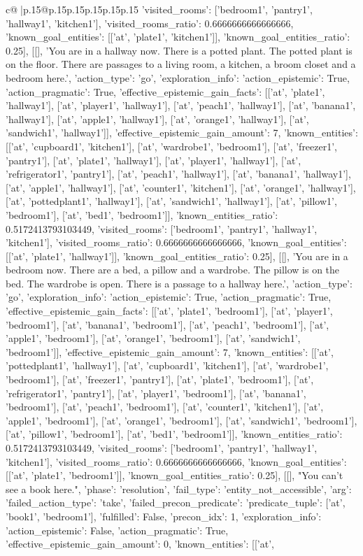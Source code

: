 \documentclass{article}
\begin{document}
{\begin{supertabular}{c@{$\;$}|p{.15\linewidth}@{}p{.15\linewidth}p{.15\linewidth}p{.15\linewidth}p{.15\linewidth}p{.15\linewidth}}
{{{'visited_rooms': ['bedroom1', 'pantry1', 'hallway1', 'kitchen1'], 'visited_rooms_ratio': 0.6666666666666666, 'known_goal_entities': [['at', 'plate1', 'kitchen1']], 'known_goal_entities_ratio': 0.25}}], [[], 'You are in a hallway now. There is a potted plant. The potted plant is on the floor. There are passages to a living room, a kitchen, a broom closet and a bedroom here.\n', {'action_type': 'go', 'exploration_info': {'action_epistemic': True, 'action_pragmatic': True, 'effective_epistemic_gain_facts': [['at', 'plate1', 'hallway1'], ['at', 'player1', 'hallway1'], ['at', 'peach1', 'hallway1'], ['at', 'banana1', 'hallway1'], ['at', 'apple1', 'hallway1'], ['at', 'orange1', 'hallway1'], ['at', 'sandwich1', 'hallway1']], 'effective_epistemic_gain_amount': 7, 'known_entities': [['at', 'cupboard1', 'kitchen1'], ['at', 'wardrobe1', 'bedroom1'], ['at', 'freezer1', 'pantry1'], ['at', 'plate1', 'hallway1'], ['at', 'player1', 'hallway1'], ['at', 'refrigerator1', 'pantry1'], ['at', 'peach1', 'hallway1'], ['at', 'banana1', 'hallway1'], ['at', 'apple1', 'hallway1'], ['at', 'counter1', 'kitchen1'], ['at', 'orange1', 'hallway1'], ['at', 'pottedplant1', 'hallway1'], ['at', 'sandwich1', 'hallway1'], ['at', 'pillow1', 'bedroom1'], ['at', 'bed1', 'bedroom1']], 'known_entities_ratio': 0.5172413793103449, 'visited_rooms': ['bedroom1', 'pantry1', 'hallway1', 'kitchen1'], 'visited_rooms_ratio': 0.6666666666666666, 'known_goal_entities': [['at', 'plate1', 'hallway1']], 'known_goal_entities_ratio': 0.25}}], [[], 'You are in a bedroom now. There are a bed, a pillow and a wardrobe. The pillow is on the bed. The wardrobe is open. There is a passage to a hallway here.\n', {'action_type': 'go', 'exploration_info': {'action_epistemic': True, 'action_pragmatic': True, 'effective_epistemic_gain_facts': [['at', 'plate1', 'bedroom1'], ['at', 'player1', 'bedroom1'], ['at', 'banana1', 'bedroom1'], ['at', 'peach1', 'bedroom1'], ['at', 'apple1', 'bedroom1'], ['at', 'orange1', 'bedroom1'], ['at', 'sandwich1', 'bedroom1']], 'effective_epistemic_gain_amount': 7, 'known_entities': [['at', 'pottedplant1', 'hallway1'], ['at', 'cupboard1', 'kitchen1'], ['at', 'wardrobe1', 'bedroom1'], ['at', 'freezer1', 'pantry1'], ['at', 'plate1', 'bedroom1'], ['at', 'refrigerator1', 'pantry1'], ['at', 'player1', 'bedroom1'], ['at', 'banana1', 'bedroom1'], ['at', 'peach1', 'bedroom1'], ['at', 'counter1', 'kitchen1'], ['at', 'apple1', 'bedroom1'], ['at', 'orange1', 'bedroom1'], ['at', 'sandwich1', 'bedroom1'], ['at', 'pillow1', 'bedroom1'], ['at', 'bed1', 'bedroom1']], 'known_entities_ratio': 0.5172413793103449, 'visited_rooms': ['bedroom1', 'pantry1', 'hallway1', 'kitchen1'], 'visited_rooms_ratio': 0.6666666666666666, 'known_goal_entities': [['at', 'plate1', 'bedroom1']], 'known_goal_entities_ratio': 0.25}}], [[], "You can't see a book here.\n", {'phase': 'resolution', 'fail_type': 'entity_not_accessible', 'arg': {'failed_action_type': 'take', 'failed_precon_predicate': {'predicate_tuple': ['at', 'book1', 'bedroom1'], 'fulfilled': False, 'precon_idx': 1}}, 'exploration_info': {'action_epistemic': False, 'action_pragmatic': True, 'effective_epistemic_gain_amount': 0, 'known_entities': [['at', }}}
\end{supertabular}}
\end{document}
